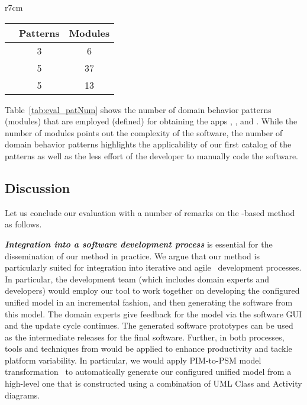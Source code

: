 {\makeatletter
	\let\par\@@par
	\par{}
	\everypar{}
	\begin{wraptable}{r}{7cm}
		\vspace{-0.4cm}
		\caption{Statistics of Behavior Patterns and Modules\\for \courseman, \processman, and \orderman}
		\label{tab:eval_patNum}
		\begin{tabular}{lcc}
			\hline
			& Patterns & Modules \\ \hline
			\courseman  & 3                  & 6                 \\ 
			\processman & 5                  & 37                \\
			\orderman   & 5                  & 13                \\ \hline
		\end{tabular}
	\end{wraptable}
%
Table~\ref{tab:eval_patNum} shows the number of domain behavior patterns (modules) that are employed (defined) for obtaining the apps \courseman, \processman, and \orderman. While the number of modules points out the complexity of the software, the number of domain behavior patterns highlights the applicability of our first catalog of the patterns as well as the less effort of the developer to manually code the software.\par
}

\subsection{Discussion} 
\label{sect:eval-discussion}

Let us conclude our evaluation with a number of remarks on the \agl-based method as follows.

\textbf{\textit{Integration into a software development process}} is essential for the dissemination of our method in practice. We argue that our method is particularly suited for integration into iterative \cite{larman_applying_2004} and agile~\cite{beck_manifesto_2017} development processes. In particular, the development team (which includes domain experts and developers) would employ our tool to work together on developing the configured unified model in an incremental fashion, and then generating the software from this model. The domain experts give feedback for the model via the software GUI and the update cycle continues. The generated software prototypes can be used as the intermediate releases for the final software. %
%
Further, in both processes, tools and techniques from  would be applied to enhance productivity and tackle platform variability. In particular, we would apply PIM-to-PSM model transformation~\cite{kent_model_2002,brambilla_model-driven_2012} to automatically generate our configured unified model from a high-level one that is constructed using a combination of UML Class and Activity diagrams.

